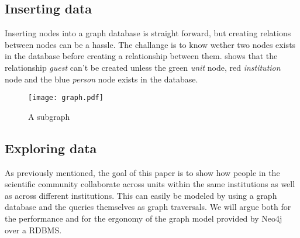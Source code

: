 \subsection*{Inserting data}
Inserting nodes into a graph database is straight forward, but creating relations between nodes can be a hassle. The challange is to know wether two nodes exists in the database before creating a relationship between them.  shows that the relationship \textit{guest} can't be created unless the green \textit{unit} node, red \textit{institution} node and the blue \textit{person} node exists in the database.

\begin{figure}[h]
  \centering
  \texttt{[image: graph.pdf]}
  \caption{A subgraph}
  \label{fig:subgraph}
\end{figure}


\subsection*{Exploring data}
As previously mentioned, the goal of this paper is to show how people in the scientific community collaborate across units within the same institutions as well as across different institutions.
This can easily be modeled by using a graph database and the queries themselves as graph traversals.
We will argue both for the performance and for the ergonomy of the graph model provided by Neo4j over a RDBMS.
